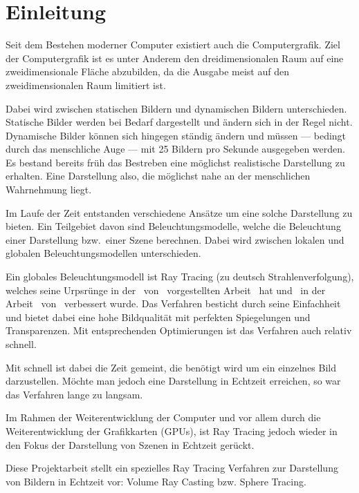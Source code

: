 
\chapter{Einleitung}
\label{chap:10_introduction}

Seit dem Bestehen moderner Computer existiert auch die Computergrafik.
Ziel der Computergrafik ist es unter Anderem den dreidimensionalen Raum
auf eine zweidimensionale Fläche abzubilden, da die Ausgabe meist auf
den zweidimensionalen Raum limitiert ist.

Dabei wird zwischen statischen Bildern und dynamischen Bildern
unterschieden. Statische Bilder werden bei Bedarf dargestellt und ändern
sich in der Regel nicht. Dynamische Bilder können sich hingegen ständig
ändern und müssen --- bedingt durch das menschliche Auge --- mit 25
Bildern pro Sekunde ausgegeben werden. Es bestand bereits früh das
Bestreben eine möglichst realistische Darstellung zu erhalten. Eine
Darstellung also, die möglichst nahe an der menschlichen Wahrnehmung
liegt.

Im Laufe der Zeit entstanden verschiedene Ansätze um eine solche
Darstellung zu bieten. Ein Teilgebiet davon sind Beleuchtungsmodelle,
welche die Beleuchtung einer Darstellung bzw.\ einer Szene berechnen.
Dabei wird zwischen lokalen und globalen Beleuchtungsmodellen
unterschieden.

Ein globales Beleuchtungsmodell ist Ray Tracing (zu deutsch
Strahlenverfolgung), welches seine Urpsrünge in
der~\citeyear{appel_techniques_1968}
von~\citeauthor{appel_techniques_1968} vorgestellten
Arbeit~ hat
und~\citeyear{whitted_improved_1980} in der
Arbeit~
von~\citeauthor{whitted_improved_1980} verbessert wurde.  Das Verfahren
besticht durch seine Einfachheit und bietet dabei
eine hohe Bildqualität mit perfekten Spiegelungen und Transparenzen. Mit
entsprechenden Optimierungen ist das Verfahren auch relativ schnell.

Mit schnell ist dabei die Zeit gemeint, die benötigt wird um ein
einzelnes Bild darzustellen. Möchte man jedoch eine Darstellung in
Echtzeit erreichen, so war das Verfahren lange zu langsam.

Im Rahmen der Weiterentwicklung der Computer und vor allem durch die
Weiterentwicklung der Grafikkarten (GPUs), ist Ray Tracing jedoch wieder
in den Fokus der Darstellung von Szenen in Echtzeit gerückt.

Diese Projektarbeit stellt ein spezielles Ray Tracing Verfahren zur
Darstellung von Bildern in Echtzeit vor: Volume Ray Casting bzw. Sphere
Tracing.
